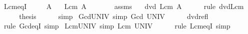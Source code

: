 \begin{isabellebody}
%
\endisatagproof
{\isafoldproof}%
%
\isadelimproof
\isanewline
%
\endisadelimproof
\isanewline
{}\isamarkupfalse%
\ Lcm{\isacharunderscore}{\kern0pt}eq{\isacharunderscore}{\kern0pt}{}{\isacharunderscore}{\kern0pt}I{\isacharcolon}{\kern0pt}\isanewline
\ \ \ {\isachardoublequoteopen}{}\ {\isasymin}\ A{\isachardoublequoteclose}\isanewline
\ \ \ {\isachardoublequoteopen}Lcm\ A\ {\isacharequal}{\kern0pt}\ {}{\isachardoublequoteclose}\isanewline
%
\isadelimproof
%
\endisadelimproof
%
\isatagproof
{}\isamarkupfalse%
\ {\isacharminus}{\kern0pt}\isanewline
\ \ \isamarkupfalse%
\ assms\ \isamarkupfalse%
\ {\isachardoublequoteopen}{}\ dvd\ Lcm\ A{\isachardoublequoteclose}\isanewline
\ \ \ \ \isamarkupfalse%
\ {\isacharparenleft}{\kern0pt}rule\ dvd{\isacharunderscore}{\kern0pt}Lcm{\isacharparenright}{\kern0pt}\isanewline
\ \ \isamarkupfalse%
\ \isamarkupfalse%
\ {\isacharquery}{\kern0pt}thesis\isanewline
\ \ \ \ \isamarkupfalse%
\ simp\isanewline
{}\isamarkupfalse%
%
\endisatagproof
{\isafoldproof}%
%
\isadelimproof
\isanewline
%
\endisadelimproof
\isanewline
{}\isamarkupfalse%
\ Gcd{\isacharunderscore}{\kern0pt}UNIV\ {\isacharbrackleft}{\kern0pt}simp{\isacharbrackright}{\kern0pt}{\isacharcolon}{\kern0pt}\ {\isachardoublequoteopen}Gcd\ UNIV\ {\isacharequal}{\kern0pt}\ {}{\isachardoublequoteclose}\isanewline
%
\isadelimproof
\ \ %
\endisadelimproof
%
\isatagproof
{}\isamarkupfalse%
\ dvd{\isacharunderscore}{\kern0pt}refl\ \isamarkupfalse%
\ {\isacharparenleft}{\kern0pt}rule\ Gcd{\isacharunderscore}{\kern0pt}eq{\isacharunderscore}{\kern0pt}{}{\isacharunderscore}{\kern0pt}I{\isacharparenright}{\kern0pt}\ simp%
\endisatagproof
{\isafoldproof}%
%
\isadelimproof
\isanewline
%
\endisadelimproof
\isanewline
{}\isamarkupfalse%
\ Lcm{\isacharunderscore}{\kern0pt}UNIV\ {\isacharbrackleft}{\kern0pt}simp{\isacharbrackright}{\kern0pt}{\isacharcolon}{\kern0pt}\ {\isachardoublequoteopen}Lcm\ UNIV\ {\isacharequal}{\kern0pt}\ {}{\isachardoublequoteclose}\isanewline
%
\isadelimproof
\ \ %
\endisadelimproof
%
\isatagproof
{}\isamarkupfalse%
\ {\isacharparenleft}{\kern0pt}rule\ Lcm{\isacharunderscore}{\kern0pt}eq{\isacharunderscore}{\kern0pt}{}{\isacharunderscore}{\kern0pt}I{\isacharparenright}{\kern0pt}\ simp%
\endisatagproof
{\isafoldproof}%

\end{isabellebody}
